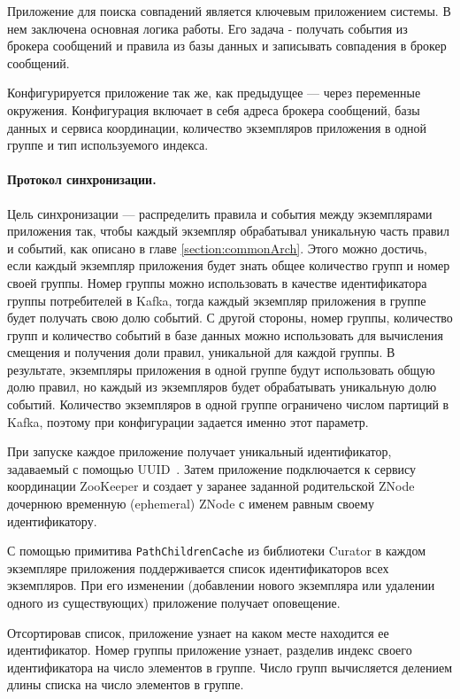 \documentclass[14pt]{article}
\begin{document}
Приложение для поиска совпадений является ключевым приложением системы. В нем заключена основная логика работы. Его задача - получать события из брокера сообщений и правила из базы данных и записывать совпадения в брокер сообщений.

Конфигурируется приложение так же, как предыдущее --- через переменные окружения. Конфигурация включает в себя адреса брокера сообщений, базы данных и сервиса координации, количество экземпляров приложения в одной группе и тип используемого индекса.

\paragraph{Протокол синхронизации.} Цель синхронизации --- распределить правила и события между экземплярами приложения так, чтобы каждый экземпляр обрабатывал уникальную часть правил и событий, как описано в главе \ref{section:commonArch}. Этого можно достичь, если каждый экземпляр приложения будет знать общее количество групп и номер своей группы. Номер группы можно использовать в качестве идентификатора группы потребителей в Kafka, тогда каждый экземпляр приложения в группе будет получать свою долю событий. С другой стороны, номер группы, количество групп и количество событий в базе данных можно использовать для вычисления смещения и получения доли правил, уникальной для каждой группы. В результате, экземпляры приложения в одной группе будут использовать общую долю правил, но каждый из экземпляров будет обрабатывать уникальную долю событий. Количество экземпляров в одной группе ограничено числом партиций в Kafka, поэтому при конфигурации задается именно этот параметр.

При запуске каждое приложение получает уникальный идентификатор, задаваемый с помощью UUID~\cite{uuid}. Затем приложение подключается к сервису координации ZooKeeper и создает у заранее заданной родительской ZNode дочернюю временную (ephemeral) ZNode с именем равным своему идентификатору.

С помощью примитива \verb|PathChildrenCache| из библиотеки Curator в каждом экземпляре приложения поддерживается список идентификаторов всех экземпляров. При его изменении (добавлении нового экземпляра или удалении одного из существующих) приложение получает оповещение.

Отсортировав список, приложение узнает на каком месте находится ее идентификатор. Номер группы приложение узнает, разделив индекс своего идентификатора на число элементов в группе. Число групп вычисляется делением длины списка на число элементов в группе.
\end{document}
